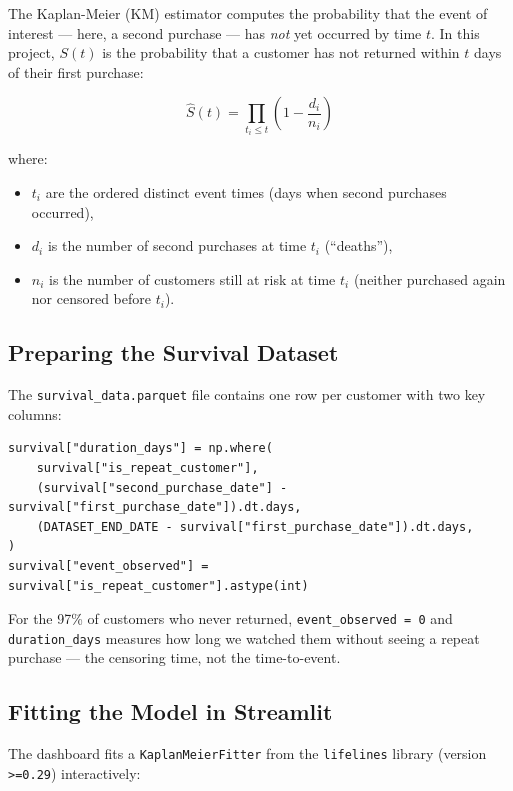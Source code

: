 The Kaplan-Meier (KM) estimator computes the probability that the event of
interest --- here, a second purchase --- has \emph{not} yet occurred by time $t$.
In this project, $S(t)$ is the probability that a customer has not returned
within $t$ days of their first purchase:

\begin{equation}
\hat{S}(t) = \prod_{t_i \leq t} \left(1 - \frac{d_i}{n_i}\right)
\label{eq:km}
\end{equation}

where:
\begin{itemize}
  \item $t_i$ are the ordered distinct event times (days when second purchases occurred),
  \item $d_i$ is the number of second purchases at time $t_i$ (``deaths''),
  \item $n_i$ is the number of customers still at risk at time $t_i$ (neither
    purchased again nor censored before $t_i$).
\end{itemize}

\subsection{Preparing the Survival Dataset}

The \texttt{survival\_data.parquet} file contains one row per customer with two
key columns:

\begin{lstlisting}[style=python, caption={Survival data construction (from \filepath{streamlit/pages/5\_metodologia.py})}]
survival["duration_days"] = np.where(
    survival["is_repeat_customer"],
    (survival["second_purchase_date"] - survival["first_purchase_date"]).dt.days,
    (DATASET_END_DATE - survival["first_purchase_date"]).dt.days,
)
survival["event_observed"] = survival["is_repeat_customer"].astype(int)
\end{lstlisting}

For the 97\% of customers who never returned, \texttt{event\_observed = 0}
and \texttt{duration\_days} measures how long we watched them without seeing a
repeat purchase --- the censoring time, not the time-to-event.

\subsection{Fitting the Model in Streamlit}

The dashboard fits a \texttt{KaplanMeierFitter} from the \texttt{lifelines}
library (version \texttt{>=0.29}) interactively:

